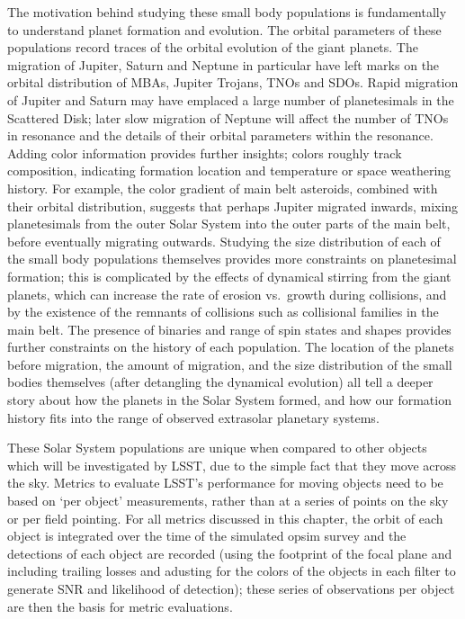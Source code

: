 The motivation behind studying these small body populations is
fundamentally to understand planet formation and evolution. The
orbital parameters of these populations record traces of the orbital
evolution of the giant planets. The migration of Jupiter, Saturn and
Neptune in particular have left marks on the orbital distribution of
MBAs, Jupiter Trojans, TNOs and SDOs. Rapid migration of
Jupiter and Saturn may have emplaced a large number of planetesimals
in the Scattered Disk; later slow migration of Neptune will affect the
number of TNOs in resonance and the details of their orbital parameters
within the resonance. Adding color information provides further
insights; colors roughly track composition, indicating formation
location and temperature or space weathering history. For example, the color
gradient of main belt asteroids, combined with their orbital
distribution, suggests that perhaps Jupiter migrated inwards,
mixing planetesimals from the outer Solar System into the outer parts
of the main belt, before eventually migrating outwards. Studying the
size distribution of each of the small body populations themselves
provides more constraints on planetesimal formation; this is
complicated by the effects of dynamical stirring from the giant
planets, which can increase the rate of erosion vs.\ growth during
collisions, and by the existence of the remnants of collisions such as
collisional families in the main belt. The presence of binaries and range
of spin states and shapes provides further constraints on the history
of each population. The location
of the planets before migration, the amount of migration, and the size
distribution of the small bodies themselves (after detangling the
dynamical evolution) all tell a deeper story about how the planets in
the Solar System formed, and how our formation history fits into the
range of observed extrasolar planetary systems.

These Solar System populations are unique when compared to other
objects which will be investigated by LSST, due to the simple fact
that they move across the sky. Metrics to evaluate
LSST's performance for moving objects need to be based on `per object'
measurements, rather than at a series of points on the sky or per
field pointing. For all metrics discussed in this chapter, the orbit
of each object is integrated over the time of the simulated opsim
survey and the detections of each object are recorded (using the
footprint of the focal plane and including
trailing losses and adusting for the colors of the objects in each
filter to generate SNR and likelihood of detection); these
series of observations per object are then the basis for metric
evaluations.


